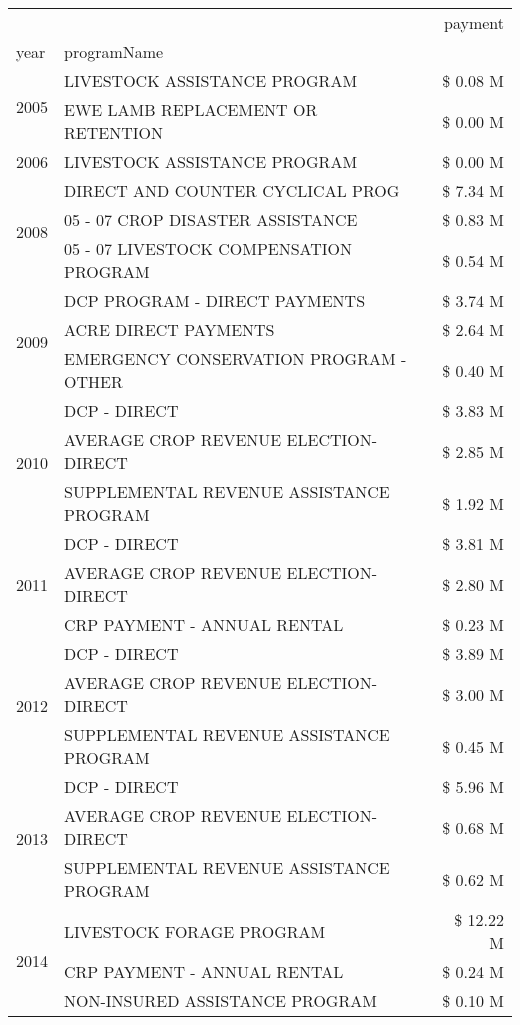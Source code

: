 \begin{tabular}{llr}
\toprule
 &  & payment \\
year & programName &  \\
\midrule
\multirow[t]{2}{*}{2005} & LIVESTOCK ASSISTANCE PROGRAM & \$ 0.08 M \\
 & EWE LAMB REPLACEMENT OR RETENTION & \$ 0.00 M \\
\cline{1-3}
2006 & LIVESTOCK ASSISTANCE PROGRAM & \$ 0.00 M \\
\cline{1-3}
\multirow[t]{3}{*}{2008} & DIRECT AND COUNTER CYCLICAL PROG & \$ 7.34 M \\
 & 05 - 07 CROP DISASTER ASSISTANCE & \$ 0.83 M \\
 & 05 - 07 LIVESTOCK COMPENSATION PROGRAM & \$ 0.54 M \\
\cline{1-3}
\multirow[t]{3}{*}{2009} & DCP PROGRAM - DIRECT PAYMENTS & \$ 3.74 M \\
 & ACRE DIRECT PAYMENTS & \$ 2.64 M \\
 & EMERGENCY CONSERVATION PROGRAM - OTHER & \$ 0.40 M \\
\cline{1-3}
\multirow[t]{3}{*}{2010} & DCP - DIRECT & \$ 3.83 M \\
 & AVERAGE CROP REVENUE ELECTION-DIRECT & \$ 2.85 M \\
 & SUPPLEMENTAL REVENUE ASSISTANCE PROGRAM & \$ 1.92 M \\
\cline{1-3}
\multirow[t]{3}{*}{2011} & DCP - DIRECT & \$ 3.81 M \\
 & AVERAGE CROP REVENUE ELECTION-DIRECT & \$ 2.80 M \\
 & CRP PAYMENT - ANNUAL RENTAL & \$ 0.23 M \\
\cline{1-3}
\multirow[t]{3}{*}{2012} & DCP - DIRECT & \$ 3.89 M \\
 & AVERAGE CROP REVENUE ELECTION-DIRECT & \$ 3.00 M \\
 & SUPPLEMENTAL REVENUE ASSISTANCE PROGRAM & \$ 0.45 M \\
\cline{1-3}
\multirow[t]{3}{*}{2013} & DCP - DIRECT & \$ 5.96 M \\
 & AVERAGE CROP REVENUE ELECTION-DIRECT & \$ 0.68 M \\
 & SUPPLEMENTAL REVENUE ASSISTANCE PROGRAM & \$ 0.62 M \\
\cline{1-3}
\multirow[t]{3}{*}{2014} & LIVESTOCK FORAGE PROGRAM & \$ 12.22 M \\
 & CRP PAYMENT - ANNUAL RENTAL & \$ 0.24 M \\
 & NON-INSURED ASSISTANCE PROGRAM & \$ 0.10 M \\

\end{tabular}
